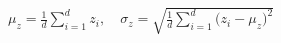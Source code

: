 \documentclass[preview]{standalone}
\begin{document}
\begin{align*}
\mu_z = \frac{1}{d}\sum_{i=1}^{d} z_i,\quad\sigma_z = \sqrt{\frac{1}{d}\sum_{i=1}^{d}\bigl(z_i - \mu_z\bigr)^2}
\end{align*}
\end{document}

